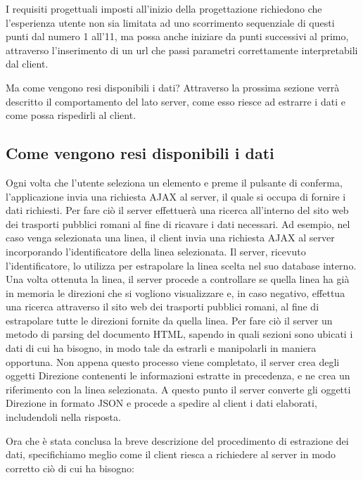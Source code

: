 I requisiti progettuali imposti all'inizio della progettazione richiedono che l'esperienza utente non sia limitata ad uno scorrimento sequenziale di questi punti dal numero 1 all'11, ma possa anche iniziare da punti successivi al primo, attraverso l'inserimento di un url che passi parametri correttamente interpretabili dal client.

Ma come vengono resi disponibili i dati? Attraverso la prossima sezione verrà descritto il comportamento del lato server, come esso riesce ad estrarre i dati e come possa rispedirli al client.


\subsection{Come vengono resi disponibili i dati} %
\label{sub:come_vengono_resi_disponibili_i_dati}

Ogni volta che l'utente seleziona un elemento e preme il pulsante di conferma, l'applicazione invia una richiesta AJAX al server, il quale si occupa di fornire i dati richiesti. Per fare ciò il server effettuerà una ricerca all'interno del sito web dei trasporti pubblici romani al fine di ricavare i dati necessari. Ad esempio, nel caso venga selezionata una linea, il client invia una richiesta AJAX al server incorporando l'identificatore della linea selezionata. Il server, ricevuto l'identificatore, lo utilizza per estrapolare la linea scelta nel suo database interno. Una volta ottenuta la linea, il server procede a controllare se quella linea ha già in memoria le direzioni che si vogliono visualizzare e, in caso negativo, effettua una ricerca attraverso il sito web dei trasporti pubblici romani, al fine di estrapolare tutte le direzioni fornite da quella linea.
Per fare ciò il server un metodo di parsing del documento HTML, sapendo in quali sezioni sono ubicati i dati di cui ha bisogno, in modo tale da estrarli e manipolarli in maniera opportuna.
Non appena questo processo viene completato, il server crea degli oggetti Direzione contenenti le informazioni estratte in precedenza, e ne crea un riferimento con la linea selezionata. A questo punto il server converte gli oggetti Direzione in formato JSON e procede a spedire al client i dati elaborati, includendoli nella risposta.

Ora che è stata conclusa la breve descrizione del procedimento di estrazione dei dati, specifichiamo meglio come il client riesca a richiedere al server in modo corretto ciò di cui ha bisogno:

